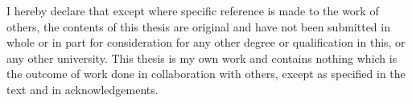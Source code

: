 
\begin{declaration}

I hereby declare that except where specific reference is made to the work of others, the contents of this thesis are original and have not been submitted in whole or in part for consideration for any other degree or qualification in this, or any other university. This thesis is my own work and contains nothing which is the outcome of work done in collaboration with others, except as specified in the text and in acknowledgements.\\ \\ \\ \\


\end{declaration}